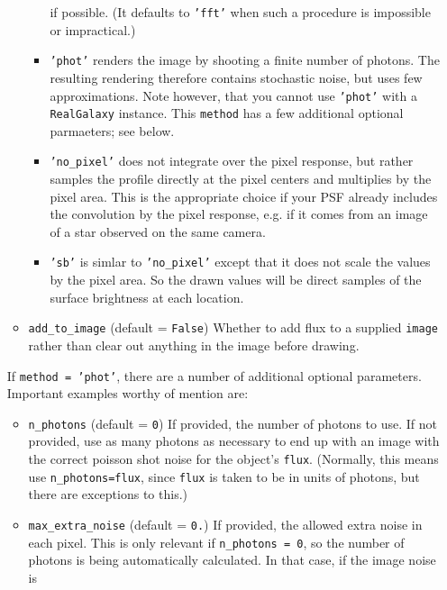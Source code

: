 \documentclass[preprint,10pt]{../../devel/modules/aastex}
\begin{document}
\begin{itemize}
\begin{itemize}
\begin{itemize}
          if possible.  (It defaults to \texttt{'fft'} when such a procedure is impossible or
          impractical.)
        \item \texttt{'phot'} renders the image by shooting a finite number of photons.
          The resulting rendering therefore contains stochastic noise, but uses few approximations.
          Note however, that you cannot use \texttt{'phot'} with a \texttt{RealGalaxy} instance.
          This \texttt{method} has a few additional optional parmaeters; see below.
        \item \texttt{'no\_pixel'} does not integrate over the pixel response, but rather samples
          the profile directly at the pixel centers and multiplies by the pixel area.  This is
          the appropriate choice if your PSF already includes the convolution by the pixel response,
          e.g. if it comes from an image of a star observed on the same camera.
        \item \texttt{'sb'} is simlar to \texttt{'no\_pixel'} except that it does not scale the
          values by the pixel area.  So the drawn values will be direct samples of the surface
          brightness at each location.
      \end{itemize}
    \item \texttt{add\_to\_image} (default = \texttt{False}) \newline
      Whether to add flux to a supplied \texttt{image} rather than clear out
      anything in the image before drawing.
  \end{itemize}
  If \texttt{method = 'phot'}, there are a number of additional optional parameters. Important
  examples worthy of mention are:
  \begin{itemize}
    \item \texttt{n\_photons} (default = \texttt{0}) \newline If provided,
      the number of photons to use.  If not provided, use as many photons
      as necessary to end up with an image with the correct poisson shot
      noise for the object's \texttt{flux}.  (Normally, this means use \texttt{n\_photons=flux},
      since \texttt{flux} is taken to be in units of photons, but there are exceptions to this.)
    \item \texttt{max\_extra\_noise} (default = \texttt{0.}) \newline If
      provided, the allowed extra noise in each pixel.  This is only
      relevant if \texttt{n\_photons = 0}, so the number of photons is
      being automatically calculated.  In that case, if the image noise is

\end{itemize}
\end{itemize}
\end{document}
